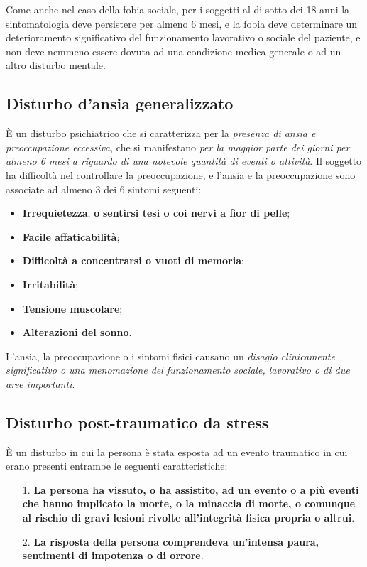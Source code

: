 Come anche nel caso della fobia sociale, per i soggetti al di sotto dei
18 anni la sintomatologia deve persistere per almeno 6 mesi, e la fobia
deve determinare un deterioramento significativo del funzionamento
lavorativo o sociale del paziente, e non deve nemmeno essere dovuta ad
una condizione medica generale o ad un altro disturbo mentale.

\subsection{Disturbo d'ansia generalizzato}

È un disturbo psichiatrico che si caratterizza per la \emph{presenza di
ansia e preoccupazione eccessiva}, che si manifestano \emph{per la
maggior parte dei giorni per almeno 6 mesi a riguardo di una notevole
quantità di eventi o attività}. Il soggetto ha difficoltà nel
controllare la preoccupazione, e l'ansia e la preoccupazione sono
associate ad almeno 3 dei 6 sintomi seguenti:

\begin{itemize}
\item
  \textbf{Irrequietezza}, \textbf{o} \textbf{sentirsi tesi o coi nervi a
  fior di pelle};
\item
  \textbf{Facile affaticabilità};
\item
  \textbf{Difficoltà a concentrarsi o vuoti di memoria};
\item
  \textbf{Irritabilità};
\item
  \textbf{Tensione muscolare};
\item
  \textbf{Alterazioni del sonno}.
\end{itemize}

L'ansia, la preoccupazione o i sintomi fisici causano un \emph{disagio
clinicamente significativo o una menomazione del funzionamento sociale,
lavorativo o di due aree importanti}.

\subsection{Disturbo post-traumatico da stress}

È un disturbo in cui la persona è stata esposta ad un evento traumatico
in cui erano presenti entrambe le seguenti caratteristiche:

\begin{itemize}
\item[1.]
  \textbf{La persona ha vissuto, o ha assistito, ad un evento o a più
  eventi che hanno implicato la morte, o la minaccia di morte, o
  comunque al rischio di gravi lesioni rivolte all'integrità fisica
  propria o altrui}.
\item[2.]
  \textbf{La risposta della persona comprendeva un'intensa paura,
  sentimenti di impotenza o di orrore}.
\end{itemize}

